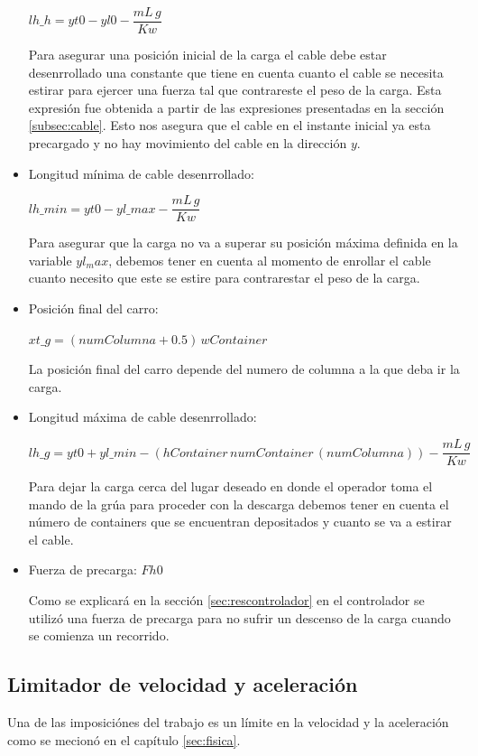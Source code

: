 \documentclass[journal]{IEEEtran}
\begin{document}
\begin{itemize}
 $lh\_h = yt0-yl0- \dfrac{mL \, g}{Kw} $ 
 
 Para asegurar una posición inicial de la carga el cable debe estar desenrrollado una 
 constante que tiene en cuenta cuanto el cable se necesita estirar para ejercer una fuerza
 tal que contrareste el peso de la carga. Esta expresión fue obtenida a partir de las 
 expresiones presentadas en la sección \ref{subsec:cable}. Esto nos asegura que el cable 
 en el instante inicial ya esta precargado y no hay movimiento del cable en la dirección
 $y$.
 
 \item Longitud mínima de cable desenrrollado: 
 
 $lh\_min = yt0 - yl\_max-\dfrac{mL \, g}{Kw}$
 
 Para asegurar que la carga no va a superar su posición máxima definida en la variable
 $yl_max$, debemos tener en cuenta al momento de enrollar el cable cuanto necesito que este
 se estire para contrarestar el peso de la carga.
 
 \item Posición final del carro:
 
 $xt\_g= (numColumna + 0.5) \, wContainer$
 
 La posición final del carro depende del numero de columna  a la que deba ir la carga.
 \item Longitud máxima de cable desenrrollado:
 
 $lh\_g= yt0 + yl\_min -  (hContainer \, numContainer \, (numColumna)) - \dfrac{mL \, g}{Kw}$
 
 Para dejar la carga cerca del lugar deseado en donde el operador toma el mando de la
 grúa para proceder con la descarga debemos tener en cuenta el número de containers que
 se encuentran depositados y cuanto se va a estirar el cable.
 
 \item Fuerza de precarga: $Fh0$
 
 Como se explicará en la sección \ref{sec:rescontrolador} en el controlador se utilizó una
 fuerza de precarga para no sufrir un descenso de la carga cuando se comienza un recorrido.
 
\end{itemize}

\subsection{Limitador de velocidad y aceleración}

Una de las imposiciónes del trabajo es un límite en la velocidad y la aceleración como se
mecionó en el capítulo \ref{sec:fisica}.
\end{document}
